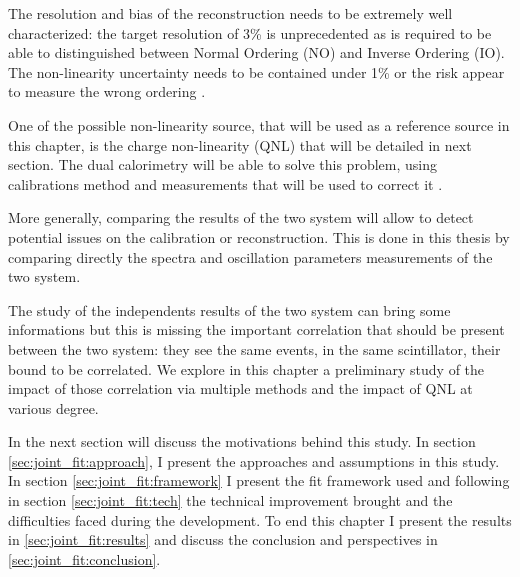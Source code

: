 \documentclass[../main.tex]{subfiles}
\begin{document}
The resolution and bias of the reconstruction needs to be extremely well characterized: the target resolution of 3\% \cite{juno_collaboration_juno_2022} is unprecedented as is required to be able to distinguished between Normal Ordering (NO) and Inverse Ordering (IO). The non-linearity uncertainty needs to be contained under 1\% or the risk appear to measure the wrong ordering \cite{han_dual_2021}.

One of the possible non-linearity source, that will be used as a reference source in this chapter, is the charge non-linearity (QNL) that will be detailed in next section. The dual calorimetry will be able to solve this problem, using calibrations method and measurements that will be used to correct it \cite{han_dual_2021}.

More generally, comparing the results of the two system will allow to detect potential issues on the calibration or reconstruction. This is done in this thesis by comparing directly the spectra and oscillation parameters measurements of the two system.

The study of the independents results of the two system can bring some informations \cite{cabrera_multi-calorimetry_2023} but this is missing the important correlation that should be present between the two system: they see the same events, in the same scintillator, their bound to be correlated. We explore in this chapter a preliminary study of the impact of those correlation via multiple methods and the impact of QNL at various degree.

In the next section will discuss the motivations behind this study. In section \ref{sec:joint_fit:approach}, I present the approaches and assumptions in this study. In section \ref{sec:joint_fit:framework} I present the fit framework used and following in section \ref{sec:joint_fit:tech} the technical improvement brought and the difficulties faced during the development. To end this chapter I present the results in \ref{sec:joint_fit:results} and discuss the conclusion and perspectives in \ref{sec:joint_fit:conclusion}.
\end{document}
